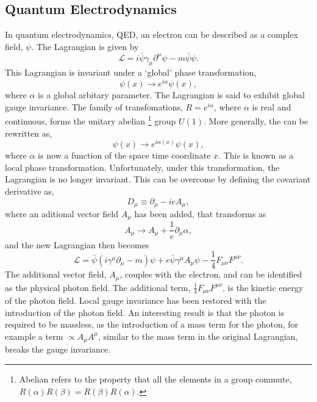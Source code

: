\subsection{Quantum Electrodynamics}
In quantum electrodynamics, QED, an electron can be described as a complex
field, $\psi$. The Lagrangian is given by
\begin{equation}
\mathcal{L} = i \bar{\psi} \gamma_{\mu} \partial^{\mu} \psi - m \bar{\psi}\psi .
\end{equation}
This Lagrangian is invariant under a `global' phase transformation,
\begin{equation}
\psi(x) \to e^{i\alpha} \psi(x),
\label{eq:global}
\end{equation}
where $\alpha$ is a global arbitary parameter. The Lagrangian is said to exhibit
global gauge invariance. The family of transfomations, $R =
e^{i \alpha}$, where $\alpha$ is real and continuous, forms the unitary
abelian \footnote{Abelian refers to the property that all the elements in a
group commute, $R(\alpha)R(\beta) = R(\beta)R(\alpha)$.}
group $U(1)$. 
More generally, the  can be rewritten as,
\begin{equation}
\psi(x) \to e^{i\alpha(x)} \psi(x),
\label{eq:local}
\end{equation}
where $\alpha$ is now a function of the space time coordinate $x$. This is known
as a local phase transformation. Unfortunately, under this transformation, the
Lagrangian is no longer invariant. This can be overcome by defining the
covariant derivative as,
\begin{equation}
D_{\mu} \equiv \partial_{\mu} - i e A_{\mu},
\end{equation}
where an aditional vector field $A_{\mu}$ has been added, that transforms as 
\begin{equation}
A_{\mu} \to A_{\mu} + \frac{1}{e} \partial_{\mu} \alpha,
\end{equation}
and the new Lagrangian then becomes
\begin{equation}
\mathcal{L} = 
\bar{\psi}(i\gamma^{\mu}\partial_{\mu} - m)\psi + 
e \bar{\psi} \gamma^{\mu} A_{\mu} \psi - 
\frac{1}{4} F_{\mu\nu} F^{\mu\nu}. 
\end{equation}
The additional vector field, $A_{\mu}$, couples with the electron,
 and can be identified as the physical photon field. The additional
term, $\frac{1}{4} F_{\mu\nu} F^{\mu\nu}$, is the kinetic energy of the photon
field. Local gauge invariance has been restored with the introduction of the photon
field. An interesting result is that the photon is required to be massless, as the introduction of
a mass term for the photon, for example a term $\propto A_{\mu}A^{\mu}$,
similar to the mass term in the original Lagrangian, breaks
the gauge invariance.

